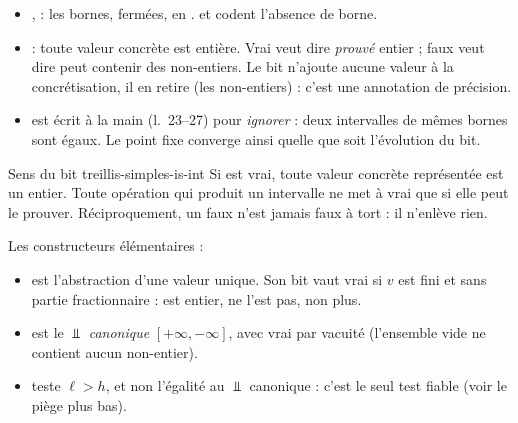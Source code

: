 
\begin{itemize}
  \item {},  : les bornes, fermées, en .
     et  codent l'absence de
    borne.
  \item {} : \og toute valeur concrète est entière\fg{}. Vrai veut
    dire \emph{prouvé} entier ; faux veut dire \og peut contenir des
    non-entiers\fg{}. Le bit n'ajoute aucune valeur à la concrétisation, il
    en retire (les non-entiers) : c'est une annotation de précision.
  \item {} est écrit à la main (l.~23--27) pour
    \emph{ignorer}  : deux intervalles de mêmes bornes sont
    égaux. Le point fixe converge ainsi quelle que soit l'évolution du bit.
\end{itemize}

\begin{invariant}{Sens du bit }{treillis-simples-is-int}
  Si  est vrai, toute valeur concrète représentée est un entier.
  Toute opération qui produit un intervalle ne met  à vrai que si
  elle peut le prouver. Réciproquement, un  faux n'est jamais
  faux \og à tort\fg{} : il n'enlève rien.
\end{invariant}

Les constructeurs élémentaires :


\begin{itemize}
  \item {} est l'abstraction d'une valeur unique. Son bit vaut
    vrai si $v$ est fini et sans partie fractionnaire :  est
    entier,  ne l'est pas,  non
    plus.
  \item {} est le $\Bot$ \emph{canonique} $[+\infty, -\infty]$,
    avec  vrai par vacuité (l'ensemble vide ne contient aucun
    non-entier).
  \item {} teste $\ell > h$, et non l'égalité au $\Bot$
    canonique : c'est le seul test fiable (voir le piège plus bas).
\end{itemize}

